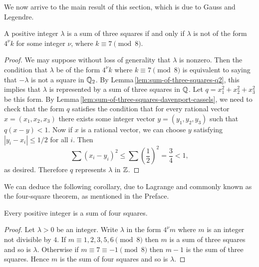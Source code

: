We now arrive to the main result of this section, which is due to Gauss and
Legendre.

\begin{theorem}
    {\normalfont \cite[pp.\,46--47]{serre2012course}} A positive integer
    \(\lambda\) is a sum of three squares if and only if \(\lambda\) is not of
    the form \(4^\nu k\) for some integer \(\nu\), where \(k \equiv 7
    \pmod{8}\).
\end{theorem}

\begin{proof}
    We may suppose without loss of generality that \(\lambda\) is nonzero. Then
    the condition that \(\lambda\) be of the form \(4^\nu k\) where \(k \equiv 7
    \pmod{8}\) is equivalent to saying that \(-\lambda\) is not a square in
    \(\mathbb{Q}_2\). By Lemma\,\ref{lem:sum-of-three-squares-q2}, this implies
    that \(\lambda\) is represented by a sum of three squares in \(\mathbb{Q}\).
    Let \(q = x_1^2 + x_2^2 + x_3^2\) be this form. By
    Lemma\,\ref{lem:sum-of-three-squares-davenport-cassels}, we need to check
    that the form \(q\) satisfies the condition that for every rational vector
    \(x = (x_1, x_2, x_3)\) there exists some integer vector \(y = (y_1, y_2,
    y_3)\) such that \(q(x - y) < 1\). Now if \(x\) is a rational vector, we can
    choose \(y\) satisfying \(|y_i - x_i| \leq 1/2\) for all \(i\). Then
    \[
        \sum(x_i - y_i)^2 \leq \sum \left(\frac{1}{2}\right)^2 = \frac{3}{4} < 1,
    \]
    as desired. Therefore \(q\) represents \(\lambda\) in \(\mathbb{Z}\).
\end{proof}

We can deduce the following corollary, due to Lagrange and commonly known as the
four-square theorem, as mentioned in the Preface.

\begin{corollary}
    Every positive integer is a sum of four squares.
\end{corollary}

\begin{proof}
    Let \(\lambda > 0\) be an integer. Write \(\lambda\) in the form
    \(4^{\nu}m\) where \(m\) is an integer not divisible by \(4\). If \(m \equiv
    1, 2, 3, 5, 6 \pmod{8}\) then \(m\) is a sum of three squares and so is
    \(\lambda\). Otherwise if \(m \equiv 7 \equiv -1 \pmod{8}\) then \(m-1\) is
    the sum of three squares. Hence \(m\) is the sum of four squares and so is
    \(\lambda\).
\end{proof}

